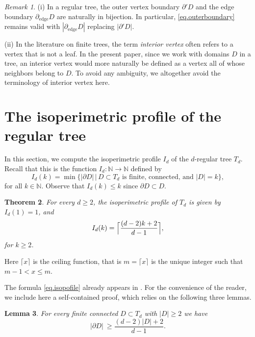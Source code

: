 \documentclass[a4paper, 11pt]{article}
\numberwithin{equation}{section}
\newtheorem{theorem}{Theorem}[section]
\newtheorem{lemma}[theorem]{Lemma}
\theoremstyle{definition}
\theoremstyle{remark}
\newtheorem{remark}[theorem]{Remark}
\begin{document}
\medskip 


\begin{remark}
(i) In a regular tree, the outer vertex boundary $\partial' D$ and the edge boundary $\partial_{\mathrm{edge}} D$ are naturally in bijection. In particular, \eqref{eq.outerboundary} remains valid with $|\partial_{\mathrm{edge}} D|$ replacing $|\partial' D|$.

\smallskip

(ii) In the literature on finite trees, the term \emph{interior vertex} often refers to a vertex that is not a leaf.
In the present paper, since we work with domains $D$ in a tree, an interior vertex would more naturally be defined as a vertex all of whose neighbors belong to $D$. To avoid any ambiguity, we altogether avoid the terminology of interior vertex here. 
\end{remark}



% 
\section{The isoperimetric profile of the regular tree} \label{sec.mainthm}

In this section, we compute the isoperimetric profile $I_d$ of the $d$-regular tree $T_d$. Recall that this is the function $I_d : \mathbb{N} \to \mathbb{N}$ defined by
\[
I_d(k) = \min \bigl\{ |\partial D| \,\big|\, D \subset T_d \text{ is finite, connected, and } |D| = k \bigr\},
\]
for all $k \in \mathbb{N}$.
Observe that $I_d(k) \leq k$  since $\partial D \subset D$. 
%
\begin{theorem}\label{thm:Id}
For every $d\ge 2$, the isoperimetric profile of $T_d$ is given by $I_d(1)=1$, and 
\begin{equation}\label{eq.isopofile}
   I_d(k)=\Bigl\lceil \frac{(d-2)k+2}{d-1}\Bigr\rceil,
\end{equation}
for $k\ge 2$.
\end{theorem}
Here $\lceil x \rceil$ is the ceiling function, that is  $m = \lceil x \rceil$ is the unique integer such that  $m-1 < x \leq m$.

\medskip 

The formula \eqref{eq.isopofile} already appears in \cite{CorreiaThesis2025}. For the convenience of the reader, we include here a self-contained proof, which relies on the following three lemmas.


\medskip 

\begin{lemma}\label{lem:Id-lower}
For every finite connected $D\subset T_d$ with $|D|\ge 2$ we have
\[
   |\partial D|\  \geq \frac{(d-2)|D|+2}{d-1}.
\]
\end{lemma}
\end{document}
